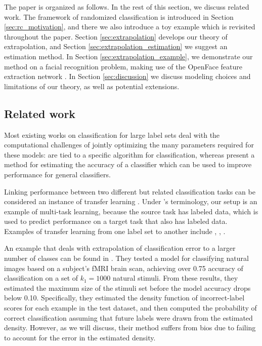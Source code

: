 \documentclass[twoside,11pt]{article}
\begin{document}
The paper is organized as follows.  In the rest of this section, we
discuss related work.  The framework of randomized classification is
introduced in Section \ref{sec:rc_motivation}, and there we also
introduce a toy example which is revisited throughout the
paper. Section \ref{sec:extrapolation} develops our theory of
extrapolation, and Section \ref{sec:extrapolation_estimation} we
suggest an estimation method. In Section
\ref{sec:extrapolation_example}, we demonstrate our method on a facial
recognition problem, making use of the OpenFace feature extraction
network \cite{amos2016openface}. In Section \ref{sec:discussion} we
discuss modeling choices and limitations of our theory, as well as
potential extensions.

\subsection{Related work}

Most existing works on classification for large label sets deal with the
computational challenges of jointly optimizing the many parameters
required for these models: \citep{crammer2001algorithmic,
  lee2004multicategory, weston1999support} are tied to a
specific algorithm for classification, whereas \cite{gupta2014training}
present a method for estimating the accuracy of a classifier which can
be used to improve performance for general classifiers.

Linking performance between two different but related classification
tasks can be considered an instance of transfer learning
\citep{pan2010survey}. Under \citeauthor{pan2010survey}'s terminology,
our setup is an example of multi-task learning, because the source
task has labeled data, which is used to predict performance on a
target task that also has labeled data.  Examples of transfer learning
from one label set to another include \cite{oquab2014learning},
\cite{donahue2014decaf}, \cite{sharif2014cnn}.

An example that deals with extrapolation of classification error to a
larger number of classes can be found in \cite{Kay2008a}. They tested
a model for classifying natural images based on a subject's fMRI brain
scan, achieving over 0.75 accuracy of classification on a set of $k_1
= 1000$ natural stimuli. From these results, they estimated the
maximum size of the stimuli set before the model accuracy drops below
0.10. Specifically, they estimated the density function of
incorrect-label scores for each example in the test dataset, and then
computed the probability of correct classification assuming that
future labels were drawn from the estimated density.  However, as we
will discuss, their method suffers from bios due to failing to account
for the error in the estimated density.
\end{document}
